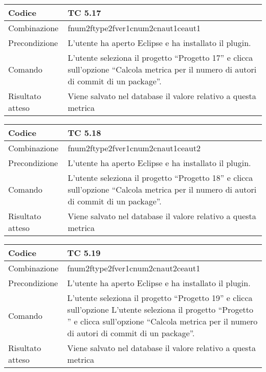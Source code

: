 \clearpage

\begin{table}[ht]
\begin{tabular}{|p{3cm}|p{9cm}|}
\hline
\cellcolor{lightgray}Codice				& TC 5.17								\\
\hline
\cellcolor{lightgray}Combinazione		& fnum2ftype2fver1cnum2cnaut1ceaut1							\\
\hline
\cellcolor{lightgray}Precondizione		& L'utente ha aperto Eclipse e ha installato il plugin.									\\
\hline
\cellcolor{lightgray}Comando			& L'utente seleziona il progetto ``Progetto 17''  e clicca sull'opzione ``Calcola metrica per il numero di autori di commit di un package''.	\\
\hline
\cellcolor{lightgray}Risultato atteso	& Viene salvato nel database il valore relativo a questa metrica	\\
\hline
\end{tabular}
\end{table}

\begin{table}[ht]
\begin{tabular}{|p{3cm}|p{9cm}|}
\hline
\cellcolor{lightgray}Codice				& TC 5.18								\\
\hline
\cellcolor{lightgray}Combinazione		& fnum2ftype2fver1cnum2cnaut1ceaut2 									\\
\hline
\cellcolor{lightgray}Precondizione		& L'utente ha aperto Eclipse e ha installato il plugin.				\\
\hline
\cellcolor{lightgray}Comando			& L'utente seleziona il progetto ``Progetto 18''  e clicca sull'opzione ``Calcola metrica per il numero di autori di commit di un package''.	\\
\hline
\cellcolor{lightgray}Risultato atteso	& Viene salvato nel database il valore relativo a questa metrica	\\
\hline
\end{tabular}
\end{table}

\begin{table}[ht]
\begin{tabular}{|p{3cm}|p{9cm}|}
\hline
\cellcolor{lightgray}Codice				& TC 5.19								\\
\hline
\cellcolor{lightgray}Combinazione		& fnum2ftype2fver1cnum2cnaut2ceaut1 									\\
\hline
\cellcolor{lightgray}Precondizione		& L'utente ha aperto Eclipse e ha installato il plugin.								\\
\hline
\cellcolor{lightgray}Comando			& L'utente seleziona il progetto ``Progetto 19''  e clicca sull'opzione L'utente seleziona il progetto ``Progetto ''  e clicca sull'opzione ``Calcola metrica per il numero di autori di commit di un package''.	\\
\hline
\cellcolor{lightgray}Risultato atteso	& Viene salvato nel database il valore relativo a questa metrica	\\
\hline
\end{tabular}
\end{table}

